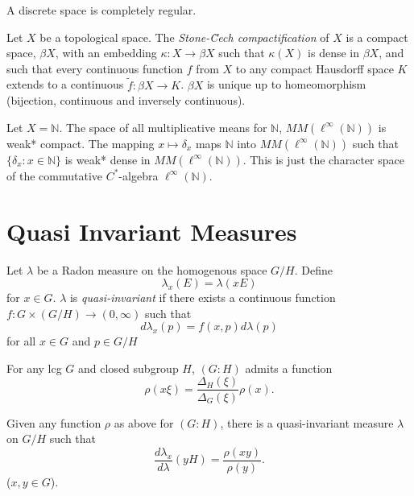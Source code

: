 \documentclass[12pt]{report}
\begin{document}
\begin{example}
A discrete space is completely regular.
\end{example}

\begin{defn}
Let $X$ be a topological space.  The {\it Stone-\u{C}ech compactification} of
$X$ is a compact space, $\beta X$, with an embedding $\kappa:X\rightarrow\beta X$
such that $\kappa(X)$ is dense in $\beta X$, and such that every continuous
function $f$ from $X$ to any compact Hausdorff space $K$ extends to a
continuous $\tilde{f}:\beta X\rightarrow K$.  $\beta X$ is unique up to homeomorphism (bijection, continuous
and inversely continuous).
\end{defn}

\begin{example}
Let $X=\mathbb{N}$.  The space of all multiplicative means for $\mathbb{N}$, $MM(\ell^\infty(\mathbb{N}))$
is weak* compact.  The mapping $x\mapsto \delta_x$ maps $\mathbb{N}$ into $MM(\ell^\infty(\mathbb{N}))$ such
that $\{\delta_x : x\in\mathbb{N}\}$ is weak* dense in $MM(\ell^\infty(\mathbb{N}))$.  This is just the
character space of the commutative $C^*$-algebra $\ell^\infty(\mathbb{N})$.
\end{example}

\section{Quasi Invariant Measures}

\begin{defn}
Let $\lambda$ be a Radon measure on the homogenous space $G/H$.
Define
\[
\lambda_x(E) = \lambda(xE)
\]
for $x\in G$.  $\lambda$ is {\it quasi-invariant} if there
exists a continuous function $f:G\times (G/H) \rightarrow (0,\infty)$ such that
\[
d\lambda_x(p) = f(x,p)d\lambda(p)
\]
for all $x\in G$ and $p\in G/H$
\end{defn}

\begin{proposition}
For any lcg $G$ and closed subgroup $H$, $(G:H)$ admits a function
\[
\rho(x\xi) = \frac{\Delta_H (\xi)}{\Delta_G (\xi)}\rho(x).
\]
\end{proposition}

\begin{theorem}
Given any function $\rho$ as above for $(G:H)$, there is a quasi-invariant measure
$\lambda$ on $G/H$ such that
\[
\frac{d\lambda_x}{d\lambda}(yH) = \frac{\rho(xy)}{\rho(y)}.
\]
($x,y\in G$).
\end{theorem}
\end{document}
